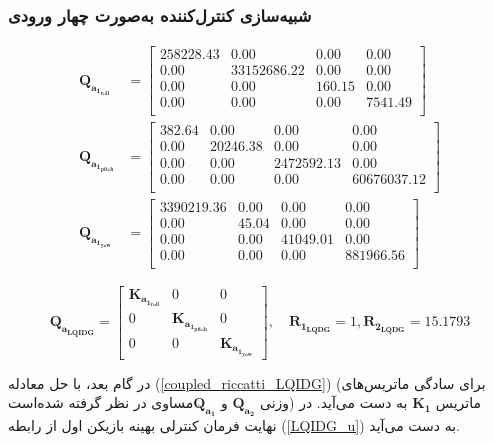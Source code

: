 \subsubsection{شبیه‌سازی کنترل‌کننده به‌صورت چهار ورودی}\label{mimo_sim}
\setcounter{MaxMatrixCols}{20}

\begin{equation}
	\begin{split}
		\boldsymbol{Q_{a_{1_{roll}}}} &= \begin{bmatrix}
258228.43 & 0.00 & 0.00 & 0.00 \\ 
0.00 & 33152686.22 & 0.00 & 0.00 \\ 
0.00 & 0.00 & 160.15 & 0.00 \\ 
0.00 & 0.00 & 0.00 & 7541.49 \\ 
		\end{bmatrix}\\
	 \boldsymbol{Q_{a_{1_{pitch}}}} & = \begin{bmatrix}
382.64 & 0.00 & 0.00 & 0.00 \\ 
0.00 & 20246.38 & 0.00 & 0.00 \\ 
0.00 & 0.00 & 2472592.13 & 0.00 \\ 
0.00 & 0.00 & 0.00 & 60676037.12 \\ 
\end{bmatrix}\\
		\boldsymbol{Q_{a_{1_{yaw}}}} &= 
		\begin{bmatrix}
3390219.36 & 0.00 & 0.00 & 0.00 \\ 
0.00 & 45.04 & 0.00 & 0.00 \\ 
0.00 & 0.00 & 41049.01 & 0.00 \\ 
0.00 & 0.00 & 0.00 & 881966.56 \\ 
		\end{bmatrix}
	\end{split}
\end{equation}


\begin{equation}
	\boldsymbol{Q_{a_{LQIDG}}}  = 
	\begin{bmatrix}
		\boldsymbol{K_{a_{1_{roll}}}}  & 0 & 0\\
		0 & \boldsymbol{K_{a_{1_{pitch}}}} & 0\\
		0 & 0 & \boldsymbol{K_{a_{1_{yaw}}}}
	\end{bmatrix}, \quad  \boldsymbol{R_{1_{LQDG}}} = 1, \boldsymbol{R_{2_{LQDG}}} = 15.1793
\end{equation}

در گام بعد، با حل معادله
(\ref{coupled_riccatti_LQIDG})
(برای سادگی ماتریس‌های وزنی $\boldsymbol{{Q}_{a_2}}$ و $\boldsymbol{{Q}_{a_1}}$مساوی در نظر گرفته شده‌است)
ماتریس
$\boldsymbol{{K}_1}$ به دست می‌آید.
در نهایت فرمان کنترلی بهینه بازیکن اول از رابطه
(\ref{LQIDG_u})
به دست می‌آید.

